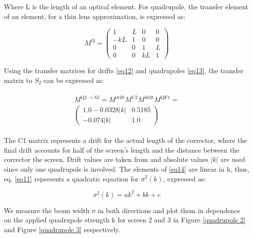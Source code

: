 \documentclass[12pt]{article}
\begin{document}
Where L is the length of an optical element. For quadrupole, the transfer element of an element, for a thin lens approximation, is expressed as:

\begin{equation}
M^{\mathrm{Q}}=\left(\begin{array}{cccc}
1 & L & 0 & 0 \\
-k L & 1 & 0 & 0 \\
0 & 0 & 1 & L \\
0 & 0 & k L & 1
\end{array}\right)
\label{eq13}
\end{equation}

Using the transfer matrices for drifts \ref{eq12} and quadrupoles \ref{eq13}, the transfer matrix to $S_2$ can be expressed as:

\begin{align}
    \begin{gathered}
        M^{\mathrm{Q} 2 \rightarrow \mathrm{S} 2}=M^{\mathrm{drift}} M^{\mathrm{C} 2} M^{\mathrm{drift}} M^{\mathrm{QF} 1} = \\
         \left(\begin{array}{cc}
        1.0 - 0.0328|k| & 0.5185 \\
        -0.074|k| & 1.0
    \end{array}\right) 
    \end{gathered}
    \label{eq14}
\end{align}

The C1 matrix represents a drift for the actual length of the corrector, where the final drift accounts for half of the screen's length and the distance between the corrector the screen. Drift values are taken from \cite{lecturenote} and absolute values $|k|$ are used since only one quadrupole is involved. The elements of \ref{eq14} are linear in k, thus, eq. \ref{eq11} represents a quadratic equation for $\sigma^{2}(k)$, expressed as:

\begin{equation}
\sigma^2(k)=a k^2+b k+c
\label{quadratic fit}
\end{equation}

We measure the beam width $\sigma$ in both directions and plot them in dependence on the applied quadrupole strength k for screen 2 and 3 in Figure \ref{quadrupole 2} and Figure \ref{quadrupole 3} respectively. 
\end{document}
